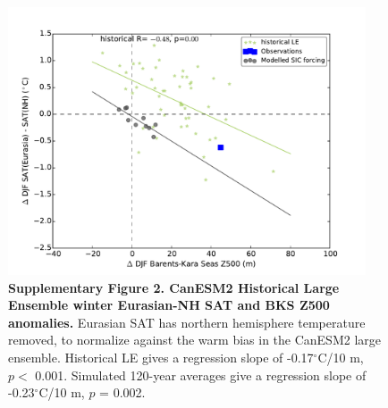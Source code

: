 \documentclass{nature}
\begin{document}
\begin{figure}%
\centering
\noindent\includegraphics[width=25pc]{SuppFigure2_nhremoved_simsadded.pdf}
\caption{\textbf{Supplementary Figure 2. CanESM2 Historical Large Ensemble winter Eurasian-NH SAT and BKS Z500 anomalies.} Eurasian SAT has northern hemisphere temperature removed, to normalize against the warm bias in the CanESM2 large ensemble. Historical LE gives a regression slope of -0.17$^\circ$C/10 m, $p <$ 0.001. Simulated 120-year averages give a regression slope of -0.23$^\circ$C/10 m, $p$ = 0.002.
}
\label{fig:supp2b} 
\end{figure}



\newpage

%






\end{document}
